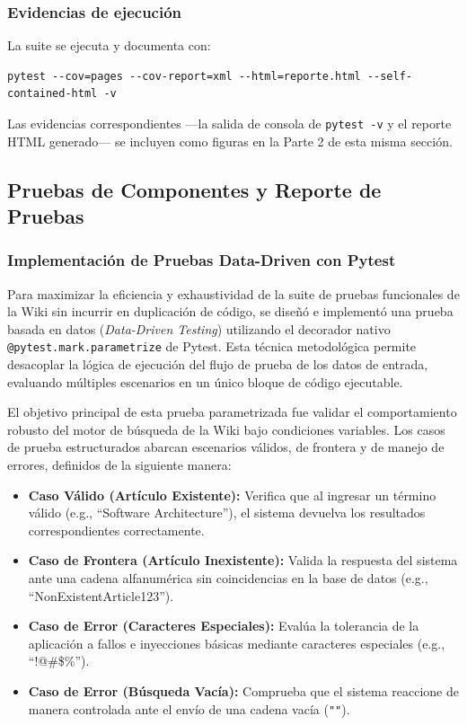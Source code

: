 \documentclass[12pt]{article}
\begin{document}
\subsubsection{Evidencias de ejecución}

La suite se ejecuta y documenta con:
\begin{lstlisting}[style=tree]
pytest --cov=pages --cov-report=xml --html=reporte.html --self-contained-html -v
\end{lstlisting}
Las evidencias correspondientes ---la salida de consola de \texttt{pytest -v} y
el reporte HTML generado--- se incluyen como figuras en la Parte 2 de esta misma
sección.



\subsection{Pruebas de Componentes y Reporte de Pruebas}

\subsubsection{Implementación de Pruebas Data-Driven con Pytest}
Para maximizar la eficiencia y exhaustividad de la suite de pruebas funcionales de la Wiki sin incurrir en duplicación de código, se diseñó e implementó una prueba basada en datos (\textit{Data-Driven Testing}) utilizando el decorador nativo \texttt{@pytest.mark.parametrize} de Pytest. Esta técnica metodológica permite desacoplar la lógica de ejecución del flujo de prueba de los datos de entrada, evaluando múltiples escenarios en un único bloque de código ejecutable.

El objetivo principal de esta prueba parametrizada fue validar el comportamiento robusto del motor de búsqueda de la Wiki bajo condiciones variables. Los casos de prueba estructurados abarcan escenarios válidos, de frontera y de manejo de errores, definidos de la siguiente manera:
\begin{itemize}
    \item \textbf{Caso Válido (Artículo Existente):} Verifica que al ingresar un término válido (e.g., ``Software Architecture''), el sistema devuelva los resultados correspondientes correctamente.
    \item \textbf{Caso de Frontera (Artículo Inexistente):} Valida la respuesta del sistema ante una cadena alfanumérica sin coincidencias en la base de datos (e.g., ``NonExistentArticle123'').
    \item \textbf{Caso de Error (Caracteres Especiales):} Evalúa la tolerancia de la aplicación a fallos e inyecciones básicas mediante caracteres especiales (e.g., ``!@\#\$\%'').
    \item \textbf{Caso de Error (Búsqueda Vacía):} Comprueba que el sistema reaccione de manera controlada ante el envío de una cadena vacía (\texttt{""}).
\end{itemize}
\end{document}
